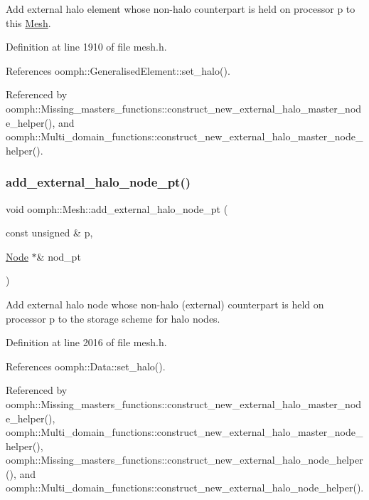 Add external halo element whose non-\/halo counterpart is held on processor p to this \hyperlink{classoomph_1_1Mesh}{Mesh}. 



Definition at line 1910 of file mesh.\+h.



References oomph\+::\+Generalised\+Element\+::set\+\_\+halo().



Referenced by oomph\+::\+Missing\+\_\+masters\+\_\+functions\+::construct\+\_\+new\+\_\+external\+\_\+halo\+\_\+master\+\_\+node\+\_\+helper(), and oomph\+::\+Multi\+\_\+domain\+\_\+functions\+::construct\+\_\+new\+\_\+external\+\_\+halo\+\_\+master\+\_\+node\+\_\+helper().

\mbox{\label{classoomph_1_1Mesh_ac0b818d3cf5f2eae2816574b6d0a4f07}} 
\subsubsection{\texorpdfstring{add\+\_\+external\+\_\+halo\+\_\+node\+\_\+pt()}{add\_external\_halo\_node\_pt()}}
{\footnotesize\ttfamily void oomph\+::\+Mesh\+::add\+\_\+external\+\_\+halo\+\_\+node\+\_\+pt (\begin{DoxyParamCaption}\item[{const unsigned \&}]{p,  }\item[{\hyperlink{classoomph_1_1Node}{Node} $\ast$\&}]{nod\+\_\+pt }\end{DoxyParamCaption})\hspace{0.3cm}{\ttfamily [inline]}}



Add external halo node whose non-\/halo (external) counterpart is held on processor p to the storage scheme for halo nodes. 



Definition at line 2016 of file mesh.\+h.



References oomph\+::\+Data\+::set\+\_\+halo().



Referenced by oomph\+::\+Missing\+\_\+masters\+\_\+functions\+::construct\+\_\+new\+\_\+external\+\_\+halo\+\_\+master\+\_\+node\+\_\+helper(), oomph\+::\+Multi\+\_\+domain\+\_\+functions\+::construct\+\_\+new\+\_\+external\+\_\+halo\+\_\+master\+\_\+node\+\_\+helper(), oomph\+::\+Missing\+\_\+masters\+\_\+functions\+::construct\+\_\+new\+\_\+external\+\_\+halo\+\_\+node\+\_\+helper(), and oomph\+::\+Multi\+\_\+domain\+\_\+functions\+::construct\+\_\+new\+\_\+external\+\_\+halo\+\_\+node\+\_\+helper().

